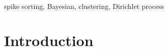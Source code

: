 \documentclass[journal]{IEEEtran}
\begin{document}
\begin{IEEEkeywords}
spike sorting, Bayesian, clustering, Dirichlet process
\end{IEEEkeywords}






%
\IEEEpeerreviewmaketitle



\section{Introduction} \label{sec:intro}
%
%
%
%
\end{document}
